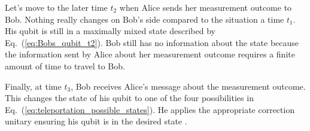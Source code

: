 Let's move to the later time $t_2$ when Alice sends her measurement outcome to Bob.
Nothing really changes on Bob's side compared to the situation a time $t_1$.
His qubit is still in a maximally mixed state described by Eq.~(\ref{eq:Bobs_qubit_t2}).
Bob still has no information about the state \ket{\psi} because the information sent by Alice about her measurement outcome requires a finite amount of time to travel to Bob.

Finally, at time $t_3$, Bob receives Alice's message about the measurement outcome.
This changes the state of his qubit to one of the four possibilities in Eq.~(\ref{eq:teleportation_possible_states}).
He applies the appropriate correction unitary ensuring his qubit is in the desired state \ket{\psi}.





